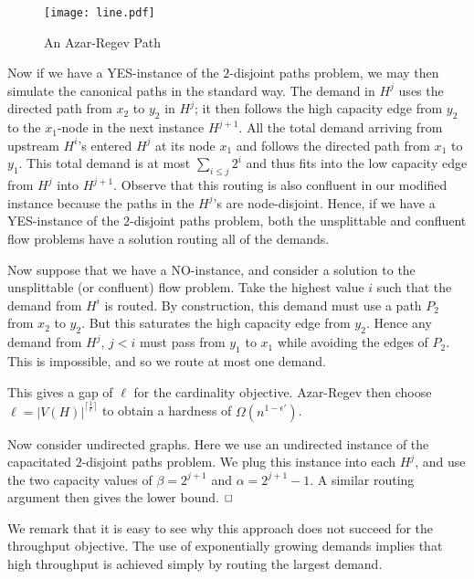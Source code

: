 \documentclass[12pt]{article}
\def\a{\alpha}
\def\b{\beta}
\newcommand{\qed}{$\hfill{\Box}$}
\begin{document}
\begin{figure}[h]
\begin{center}
\texttt{[image: line.pdf]}\\
\vspace{-6cm}
\caption{\label{fig:line} An Azar-Regev Path}
\end{center}
\end{figure}


Now if we have a YES-instance of the $2$-disjoint paths problem,
we may then simulate the canonical paths in the standard way. The demand in $H^j$ uses  the directed path
from $x_2$ to $y_2$ in $H^j$; it then follows the high capacity edge from $y_2$ to the $x_1$-node in the
 next instance $H^{j+1}$. All the total demand arriving from upstream $H^i$'s entered $H^{j}$ at its node $x_1$ and
 follows the directed path from $x_1$ to $y_1$. This total demand is at most $\sum_{i \leq j} 2^i$ and thus fits into the low
 capacity edge from $H^j$ into $H^{j+1}$.
Observe that this routing is also confluent in our modified instance because the paths in the $H^j$'s are node-disjoint.
 Hence, if we have a YES-instance
 of the $2$-disjoint paths problem, both the unsplittable and confluent flow problems have a solution routing all of the demands.

 Now suppose that we have a NO-instance, and consider a solution to the unsplittable (or confluent) flow problem.
 Take the highest value $i$ such that
 the demand from $H^i$ is routed. By construction, this demand must use a path $P_2$ from $x_2$ to $y_2$. But this
 saturates the high capacity edge from $y_2$. Hence  any demand from $H^j$, $j < i$ must pass from $y_1$ to $x_1$ while
 avoiding the edges of $P_2$. This is impossible, and so we route at most one demand.

 This gives a gap of $\ell$ for the cardinality objective. Azar-Regev then choose $\ell = |V(H)|^{\lceil \frac{1}{\epsilon} \rceil}$
to obtain a hardness of $\Omega(n^{1-\epsilon'})$.

Now consider undirected graphs. Here we use an
undirected instance of the capacitated $2$-disjoint paths problem.
We plug this instance into each $H^j$, and use the two capacity values of
$\b=2^{j+1}$ and $\a=2^{j+1}-1$.
A similar routing argument then gives the lower bound. \qed




We remark that it is easy to see why this approach does not succeed for the throughput objective.
The use of exponentially growing demands implies that high throughput is achieved simply
by routing the largest demand.
\end{document}
